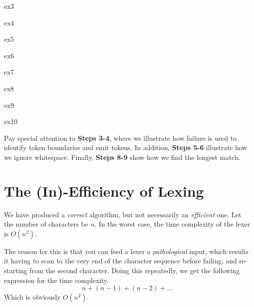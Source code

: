 \begin{minipage}{0.5\textwidth}
    {ex3}
\end{minipage}%
\begin{minipage}{0.5\textwidth}
    {ex4}
\end{minipage}

\begin{minipage}{0.5\textwidth}
    {ex5}
\end{minipage}%
\begin{minipage}{0.5\textwidth}
    {ex6}
\end{minipage}

\begin{minipage}{0.5\textwidth}
    {ex7}
\end{minipage}%
\begin{minipage}{0.5\textwidth}
    {ex8}
\end{minipage}

\begin{minipage}{0.5\textwidth}
    {ex9}
\end{minipage}%
\begin{minipage}{0.5\textwidth}
    {ex10}
\end{minipage}

Pay special attention to \textbf{\textsf{Steps 3-4}}, where we illustrate how failure is used to identify token boundaries and emit tokens. In addition, \textbf{\textsf{Steps 5-6}} illustrate how we ignore whitespace. Finally, \textbf{\textsf{Steps 8-9}} show how we find the longest match.
    
\section{The (In)-Efficiency of Lexing}
We have produced a \emph{correct} algorithm, but not necessarily an \emph{efficient} one. Let the number of characters be $n$. In the worst case, the time complexity of the lexer is $O(n^2)$. 

The reason for this is that you can feed a lexer a \emph{pathological} input, which results it having to scan to the very end of the character sequence before failing, and re-starting from the second character. Doing this repeatedly, we get the following expression for the time complexity.
\[ n + (n-1) + (n-2) + \ldots \]
Which is obviously $O(n^2)$.

